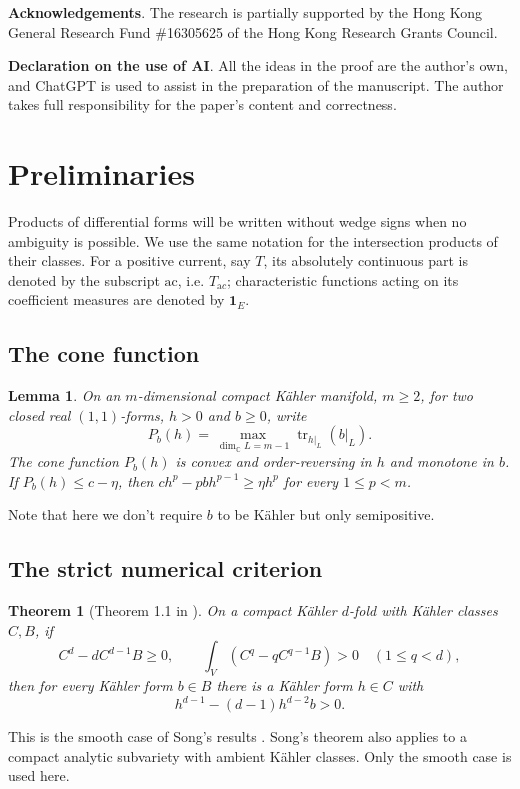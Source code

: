 \documentclass[reqno]{amsart}
\theoremstyle{remark}
\theoremstyle{plain}
\newtheorem{lemma}[thm]{Lemma}
\newtheorem{theorem}[thm]{Theorem}
\begin{document}
\textbf{Acknowledgements}. The research is partially supported by the Hong Kong General Research Fund \#16305625 of the Hong Kong Research Grants Council.

\textbf{Declaration on the use of AI}. All the ideas in the proof are the author's own, and ChatGPT is used to assist in the preparation of the
manuscript.  The author takes full responsibility for the paper’s content and correctness.


\section{Preliminaries}

Products of differential forms will be written without wedge signs when no ambiguity is possible. We use the same notation for the intersection products of their classes. For a positive current, say $T$, its absolutely continuous part is denoted by the subscript \(\mathrm{ac}\), i.e.  $T_{\mathrm ac}$; characteristic functions acting on its coefficient measures are denoted by \(\mathbf 1_E\).

\subsection{The cone function}
\begin{lemma}\label{lem:matrix-cone}
On an \(m\)-dimensional compact K\"ahler manifold, \(m\ge2\), for two closed real $(1,1)$-forms, \(h>0\) and \(b\ge0\), write
\[
P_b(h)=\max_{\dim_{\mathbb C}L=m-1}
\operatorname{tr}_{h|_L}(b|_L).
\]
The cone function $P_b(h)$ is convex and order-reversing in $h$ and monotone in $b$. If \(P_b(h)\le c-\eta\), then \(ch^p-pbh^{p-1}\ge\eta h^p\) for every \(1\le p<m\). 
\end{lemma}
Note that here we don't require $b$ to be K\"ahler but only semipositive. 

 


\subsection{The strict numerical criterion}

\begin{theorem}[Theorem 1.1 in \cite{S20}]\label{thm:song}
On a compact K\"ahler \(d\)-fold with K\"ahler classes \(C,B\), if
   \[
C^d-dC^{d-1}B\ge0,\qquad
   \int_V(C^q-qC^{q-1}B)>0\quad(1\le q<d),
\]
   then for every K\"ahler form \(b\in B\) there is a K\"ahler form \(h\in C\) with
   \[
h^{d-1}-(d-1)h^{d-2}b>0.
\]
\end{theorem}
This is the smooth case of Song's results \cite[Theorem 1.1]{S20}. Song's theorem also applies to a compact analytic subvariety with ambient K\"ahler classes. Only the smooth case is used here.
\end{document}
